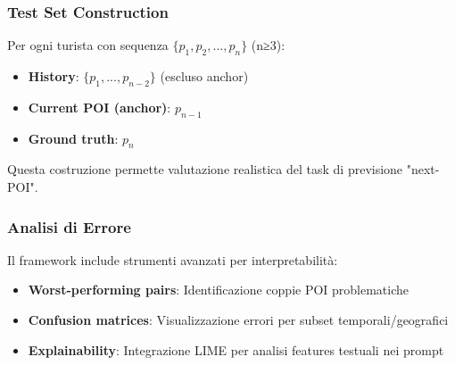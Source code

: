 \subsubsection{Test Set Construction}

Per ogni turista con sequenza $\{p_1, p_2, ..., p_n\}$ (n≥3):
\begin{itemize}
\item \textbf{History}: $\{p_1, ..., p_{n-2}\}$ (escluso anchor)
\item \textbf{Current POI (anchor)}: $p_{n-1}$ 
\item \textbf{Ground truth}: $p_n$
\end{itemize}

Questa costruzione permette valutazione realistica del task di previsione "next-POI".

\subsubsection{Analisi di Errore}

Il framework include strumenti avanzati per interpretabilità:
\begin{itemize}
\item \textbf{Worst-performing pairs}: Identificazione coppie POI problematiche
\item \textbf{Confusion matrices}: Visualizzazione errori per subset temporali/geografici  
\item \textbf{Explainability}: Integrazione LIME per analisi features testuali nei prompt
\end{itemize}